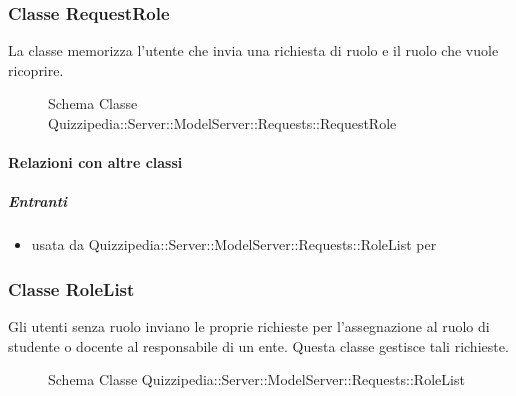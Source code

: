 \subsubsection{Classe RequestRole}
La classe memorizza l'utente che invia una richiesta di ruolo e il ruolo che vuole ricoprire.
\begin{figure}[H]
\centering
\noindent{}
\caption[Schema Classe RequestRole]{Schema Classe Quizzipedia::Server::ModelServer::Requests::RequestRole}
\end{figure}
\paragraph{Relazioni con altre classi}
\subparagraph{Entranti}
\begin{itemize}
\item usata da Quizzipedia::Server::ModelServer::Requests::RoleList per 
\end{itemize}
\subsubsection{Classe RoleList}
Gli utenti senza ruolo inviano le proprie richieste per l'assegnazione al ruolo di studente o docente al responsabile di un ente. Questa classe gestisce tali richieste.
\begin{figure}[H]
\centering
\noindent{}
\caption[Schema Classe RoleList]{Schema Classe Quizzipedia::Server::ModelServer::Requests::RoleList}
\end{figure}
